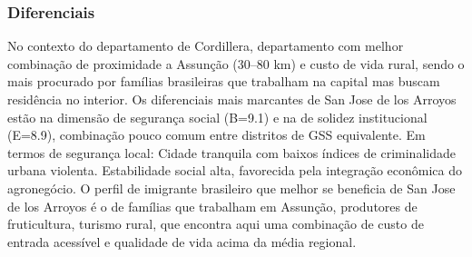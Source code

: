 \subsubsection*{Diferenciais}\label{dif-san-jose-de-los-arroyos-0317}
No contexto do departamento de Cordillera, departamento com melhor combinação de proximidade a Assunção (30–80 km) e custo de vida rural, sendo o mais procurado por famílias brasileiras que trabalham na capital mas buscam residência no interior. Os diferenciais mais marcantes de San Jose de los Arroyos estão na dimensão de segurança social (B=9.1) e na de solidez institucional (E=8.9), combinação pouco comum entre distritos de GSS equivalente. Em termos de segurança local: Cidade tranquila com baixos índices de criminalidade urbana violenta. Estabilidade social alta, favorecida pela integração econômica do agronegócio. O perfil de imigrante brasileiro que melhor se beneficia de San Jose de los Arroyos é o de famílias que trabalham em Assunção, produtores de fruticultura, turismo rural, que encontra aqui uma combinação de custo de entrada acessível e qualidade de vida acima da média regional.
